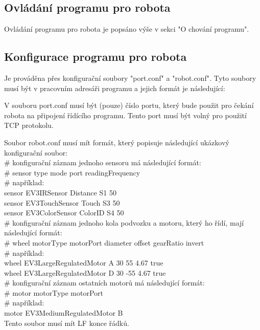 \documentclass[12pt, ngerman]{article}
\begin{document}
\subsection{Ovládání programu pro robota}
Ovládání programu pro robota je popsáno výše v sekci "O chování programu".

\subsection{Konfigurace programu pro robota}
Je prováděna přes konfigurační soubory "port.conf" a "robot.conf". Tyto soubory musí být v pracovním adresáři programu a jejich formát je následující:

V souboru port.conf musí být (pouze) číslo portu, který bude použit pro čekání robota na připojení řídícího programu. Tento port musí být volný pro použití TCP protokolu.

Soubor robot.conf musí mít formát, který popisuje následující ukázkový konfigurační soubor:\\

\# konfigurační záznam jednoho sensoru má následující formát:\\
\# sensor type           mode     port readingFrequency\\
\# například:\\
sensor  EV3IRSensor    Distance S1   50\\
sensor  EV3TouchSensor Touch    S3   50\\
sensor  EV3ColorSensor ColorID  S4   50\\

\# konfigurační záznam jednoho kola podvozku a motoru, který ho řídí, mají následující formát:\\
\# wheel motorType              motorPort diameter offset gearRatio invert\\
\# například:\\
wheel  EV3LargeRegulatedMotor A         30       55     4.67      true\\
wheel  EV3LargeRegulatedMotor D         30       -55    4.67      true\\

\# konfigurační záznam ostatních motorů má následující formát:\\
\# motor motorType               motorPort\\
\# například:\\
motor  EV3MediumRegulatedMotor B\\

Tento soubor musí mít LF konce řádků.
\end{document}
